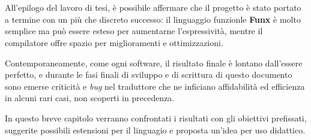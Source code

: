\chapter{}
\label{chap:6-conclusions}

All'epilogo del lavoro di tesi, è possibile affermare che il progetto è stato portato a termine con un più che discreto successo:
il linguaggio funzionle \textbf{Funx} è molto semplice ma può essere esteso per aumentarne l'espressività,
mentre il compilatore offre spazio per miglioramenti e ottimizzazioni.


Contemporaneamente, come ogni software, il risultato finale è lontano dall'essere perfetto,
e durante le fasi finali di sviluppo e di scrittura di questo documento sono emerse criticità e \textit{bug}
nel traduttore che ne inficiano affidabilità ed efficienza in alcuni rari casi, non scoperti in precedenza.


In questo breve capitolo verranno confrontati i risultati con gli obiettivi prefissati,
suggerite possibili estensioni per il linguagio e proposta un'idea per uso didattico.



\newpage



